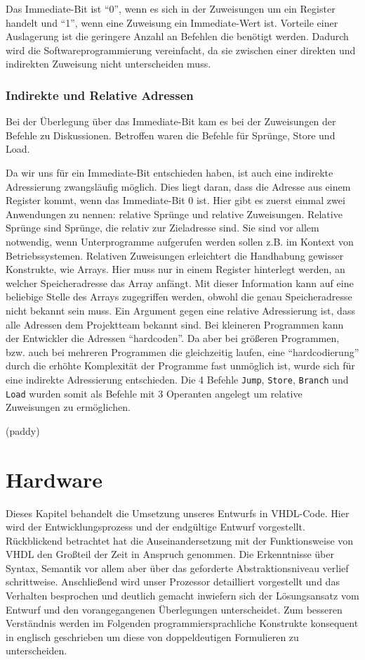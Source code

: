 \documentclass[paper=a4,fontsize=12pt,twocolumn]{scrreprt}
\begin{document}
Das Immediate-Bit ist \enquote{0}, wenn es sich in der Zuweisungen um ein Register handelt und \enquote{1}, wenn eine Zuweisung ein Immediate-Wert ist.
Vorteile einer Auslagerung ist die geringere Anzahl an Befehlen die benötigt werden.
Dadurch wird die Softwareprogrammierung vereinfacht, da sie zwischen einer direkten und indirekten Zuweisung nicht unterscheiden muss.

\subsection{Indirekte und Relative Adressen}
\label{subsec:indirekte_und_relative_adressen}
Bei der Überlegung über das Immediate-Bit kam es bei der Zuweisungen der Befehle zu Diskussionen.
Betroffen waren die Befehle für Sprünge, Store und Load.

Da wir uns für ein Immediate-Bit entschieden haben, ist auch eine indirekte Adressierung zwangsläufig möglich.
Dies liegt daran, dass die Adresse aus einem Register kommt, wenn das Immediate-Bit 0 ist.
Hier gibt es zuerst einmal zwei Anwendungen zu nennen: relative Sprünge und relative Zuweisungen.
Relative Sprünge sind Sprünge, die relativ zur Zieladresse sind.
Sie sind vor allem notwendig, wenn Unterprogramme aufgerufen werden sollen z.B. im Kontext von Betriebssystemen.
Relativen Zuweisungen erleichtert die Handhabung gewisser Konstrukte, wie Arrays.
Hier muss nur in einem Register hinterlegt werden, an welcher Speicheradresse das Array anfängt.
Mit dieser Information kann auf eine beliebige Stelle des Arrays zugegriffen werden, obwohl die genau Speicheradresse nicht bekannt sein muss.
Ein Argument gegen eine relative Adressierung ist, dass alle Adressen dem Projektteam bekannt sind.
Bei kleineren Programmen kann der Entwickler die Adressen \enquote{hardcoden}.
Da aber bei größeren Programmen, bzw. auch bei mehreren Programmen die gleichzeitig laufen, eine  \enquote{hardcodierung} durch die erhöhte Komplexität der Programme fast unmöglich ist, wurde sich für eine indirekte Adressierung entschieden.
Die 4 Befehle \texttt{Jump}, \texttt{Store}, \texttt{Branch} und \texttt{Load} wurden somit als Befehle mit 3 Operanten angelegt um relative Zuweisungen zu ermöglichen.

(paddy)

\chapter{Hardware}
\label{ch:hardware}

Dieses Kapitel behandelt die Umsetzung unseres Entwurfs in VHDL-Code.
Hier wird der Entwicklungsprozess und der endgültige Entwurf vorgestellt. Rückblickend betrachtet hat die Auseinandersetzung mit der Funktionsweise von VHDL den Großteil der Zeit in Anspruch genommen.
Die Erkenntnisse über Syntax, Semantik vor allem aber über das geforderte Abstraktionsniveau verlief schrittweise.
Anschließend wird unser Prozessor detailliert vorgestellt und das Verhalten besprochen und deutlich gemacht inwiefern sich der Lösungsansatz vom Entwurf und den vorangegangenen Überlegungen unterscheidet.
Zum besseren Verständnis werden im Folgenden programmiersprachliche Konstrukte konsequent in englisch geschrieben um diese von doppeldeutigen Formulieren zu unterscheiden.
\end{document}
